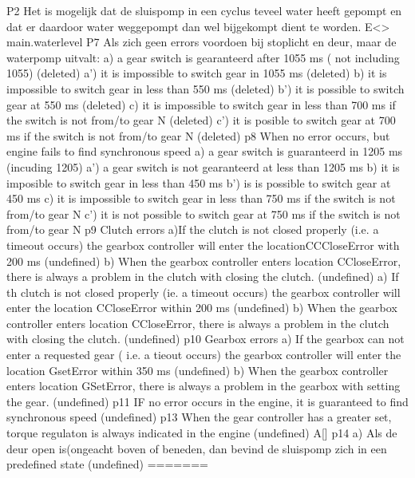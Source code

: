  P2 Het is mogelijk dat de sluispomp in een cyclus teveel water heeft gepompt en dat er daardoor water weggepompt dan wel bijgekompt dient te worden.
 E<> main.waterlevel
 P7  Als zich geen errors voordoen bij stoplicht en deur, maar de waterpomp uitvalt:
 a)  a gear switch is gearanteerd after 1055 ms ( not including  1055)  (deleted)
 a') it is impossible  to switch gear in 1055 ms     (deleted)
 b) it is  impossible to switch gear in less than 550 ms (deleted)
 b') it is possible to switch gear at 550 ms (deleted)
 c) it is impossible to switch  gear in  less than 700 ms if the switch is not from/to gear N (deleted)
 c') it is posible to switch gear at 700 ms if the switch is not from/to gear N (deleted)
 p8 When no error occurs, but engine fails to find synchronous speed
 a) a gear switch is guaranteerd in 1205 ms (incuding 1205)
 a') a gear switch is not gearanteerd at less than 1205 ms
 b) it is imposible to switch gear in less than 450 ms
 b') is is possible to switch gear at 450 ms
 c) it is impossible to switch gear in less than 750 ms if the switch is not from/to gear N
 c') it is not possible to switch gear at 750 ms if the switch is not from/to gear N
 p9 Clutch errors
 a)If the clutch is not closed properly (i.e. a timeout occurs) the gearbox  controller will enter the locationCCCloseError with 200 ms   (undefined)
 b)  When the gearbox controller enters location CCloseError, there is always a problem in the clutch with closing the clutch.  (undefined)
 a) If th clutch is not closed properly (ie. a timeout occurs) the gearbox controller will enter the location CCloseError within 200 ms (undefined)
 b) When the gearbox controller enters location CCloseError, there is always a problem in the clutch with closing the clutch. (undefined)
 p10 Gearbox errors  
 a) If the gearbox can not enter a requested gear ( i.e. a tieout occurs) the gearbox controller will enter the location GsetError within 350 ms (undefined)
 b) When the gearbox controller enters location GSetError, there is always a problem in the gearbox with setting the gear. (undefined)
 p11 IF no error occurs in the engine, it is guaranteed to find synchronous speed (undefined)
 p13 When the gear controller has a greater set, torque regulaton is always indicated in the engine (undefined)
  A[]
 p14
 a) Als de deur open is(ongeacht boven of beneden, dan bevind de sluispomp zich in een predefined state (undefined)
=======

